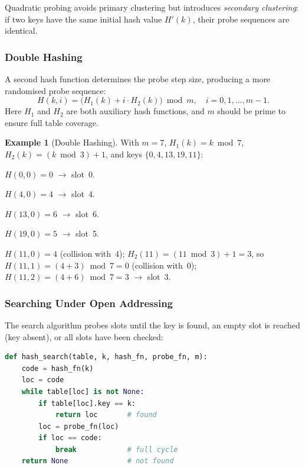 \documentclass[11pt, a4paper, notitlepage]{report}
\theoremstyle{definition}
\theoremstyle{remark}
\theoremstyle{definition}
\newtheorem{example}[theorem]{Example}
\begin{document}
Quadratic probing avoids primary clustering but introduces \emph{secondary
clustering}: if two keys have the same initial hash value $H'(k)$, their
probe sequences are identical.

\subsubsection{Double Hashing}
\label{subsubsec:double-hashing}

A second hash function determines the probe step size, producing a more
randomised probe sequence:
\[
  H(k, i) = \bigl(H_1(k) + i \cdot H_2(k)\bigr) \bmod m,
  \quad i = 0, 1, \ldots, m-1.
\]
Here $H_1$ and $H_2$ are both auxiliary hash functions, and $m$ should be
prime to ensure full table coverage.

\begin{example}[Double Hashing]
\label{ex:double-hashing}
With $m = 7$, $H_1(k) = k \bmod 7$, $H_2(k) = (k \bmod 3) + 1$, and
keys $\{0, 4, 13, 19, 11\}$:

$H(0,0) = 0$ $\to$ slot~0.

$H(4,0) = 4$ $\to$ slot~4.

$H(13,0) = 6$ $\to$ slot~6.

$H(19,0) = 5$ $\to$ slot~5.

$H(11,0) = 4$ (collision with~4); $H_2(11) = (11 \bmod 3)+1 = 3$,
so $H(11,1) = (4 + 3) \bmod 7 = 0$ (collision with~0);
$H(11,2) = (4 + 6) \bmod 7 = 3$ $\to$ slot~3.
\end{example}

\subsubsection{Searching Under Open Addressing}
\label{subsubsec:open-search}

The search algorithm probes slots until the key is found, an empty slot is
reached (key absent), or all slots have been checked:

\begin{lstlisting}[language=Python]
def hash_search(table, k, hash_fn, probe_fn, m):
    code = hash_fn(k)
    loc = code
    while table[loc] is not None:
        if table[loc].key == k:
            return loc       # found
        loc = probe_fn(loc)
        if loc == code:
            break            # full cycle
    return None              # not found
\end{lstlisting}
\end{document}
